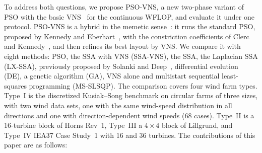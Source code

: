 To address both questions, we propose PSO-VNS, a new two-phase variant of PSO with the basic VNS~\cite{Mladenovic1997,Hansen2001} for the continuous WFLOP, and evaluate it under one protocol. PSO-VNS is a hybrid in the memetic sense~\cite{Neri2012}: it runs the standard PSO, proposed by Kennedy and Eberhart~\cite{Kennedy1995}, with the constriction coefficients of Clerc and Kennedy~\cite{Clerc2002}, and then refines its best layout by VNS. We compare it with eight methods: PSO, the SSA with VNS (SSA-VNS), the SSA, the Laplacian SSA (LX-SSA), previously proposed by Solanki and Deep~\cite{Solanki2023}, differential evolution (DE), a genetic algorithm (GA), VNS alone and multistart sequential least-squares programming (MS-SLSQP). The comparison covers four wind farm types. Type~I is the discretized Kusiak--Song benchmark on circular farms of three sizes, with two wind data sets, one with the same wind-speed distribution in all directions and one with direction-dependent wind speeds (68 cases). Type~II is a 16-turbine block of Horns Rev~1, Type~III a $4\times4$ block of Lillgrund, and Type~IV IEA37 Case Study~1 with 16 and 36 turbines. The contributions of this paper are as follows:

